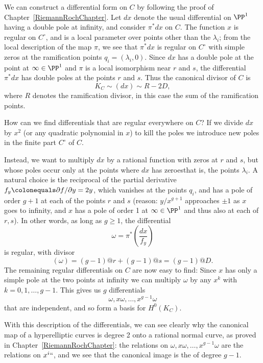 We can construct a differential form on $C$ by following the proof of
%
Chapter~\ref{RiemannRochChapter}.
Let $dx$ denote the usual differential on $\PP^1$ having a double
pole at infinity, and consider $\pi^*dx$ on $C$.  The function $x$ is
regular on $C^\circ$, and is a local parameter over points other than
the $\lambda_i$; from the local description of the map $\pi$, we see that
$\pi^*dx$ is regular on $C^\circ$  with simple zeros at the ramification
points $q_i = (\lambda_i, 0)$. Since $dx$ has a double pole at the
point at $\infty\in \PP^1$ and $\pi$ is a local isomorphism near $r$
and $s$, the differential $\pi^*dx$ has double poles at the points $r$
and $s$. Thus the canonical
divisor of $C$ is
$$
 K_C \sim (dx) \sim R - 2D,
$$
where $R$ denotes the ramification divisor, in this case the sum of the
ramification points.

How can we find differentials that are regular everywhere on $C$? If we
divide $dx$ by $x^2$ (or any quadratic polynomial in $x$) to kill the
poles we  introduce new poles in the finite part $C^\circ$ of $C$.

Instead, we want to multiply $dx$ by a rational function with zeros
at $r$ and $s$, but whose poles occur only at the points where $dx$
has zeroes\emdash that is, the points $\lambda_i$.  A natural choice is the
reciprocal of the partial derivative $f_y \colonequals  \partial f/ \partial y =
2y$, which vanishes at the points $q_i$, and has  a pole of order $g+1$
at each of the points $r$ and $s$ (reason: $y/x^{g+1}$ approaches $\pm
1$ as $x$ goes to infinity, and $x$ has a pole of order 1 at $\infty\in
\PP^{1}$ and thus also at each of $r,s$). In other words, as long as $g
\geq 1$, the differential
$$
\omega = \pi^*\left(\frac{dx}{f_y}\right)
$$
is regular, with divisor
$$
(\omega) = (g-1)@r + (g-1)@s = (g-1)@D.
$$
The remaining regular differentials on $C$ are now easy to find: Since
$x$ has only a simple pole
at the two points at infinity we can  multiply $\omega$ by any $x^k$ with
$k = 0, 1, \dots, g-1$.
This gives us $g$ differentials
$$
\omega, x\omega, \dots, x^{g-1}\omega
$$
that are independent, and so form a basis for $H^0(K_C)$.

With this description of the differentials, we can see clearly why the
canonical map of a hyperelliptic curves is degree 2 onto a rational
normal curve, as proved in Chapter~\ref{RiemannRochChapter}:
the relations on
$
\omega, x\omega, \dots, x^{g-1}\omega
$
are the relations on $x^i` `$, and we see that the canonical image is the
%
 of degree $g-1$.

